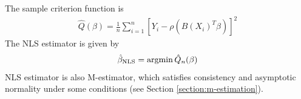 \documentclass[11pt]{elegantbook}
\newcommand{\argmin}{\operatornamewithlimits{argmin}}
\begin{document}
The sample criterion function is
\begin{equation}
    \begin{aligned}
        \hat{Q}(\beta)=\frac{1}{n}\sum_{i=1}^n[Y_i-\rho(B(X_i)^T\beta)]^2
    \end{aligned}
    \nonumber
\end{equation}
The NLS estimator is given by
\begin{equation}
    \begin{aligned}
        \hat{\beta}_\textnormal{NLS}=\argmin \hat{Q}_n(\beta)
    \end{aligned}
    \nonumber
\end{equation}
NLS estimator is also M-estimator, which satisfies consistency and asymptotic normality under some conditions (see Section \ref{section:m-estimation}).
\end{document}
